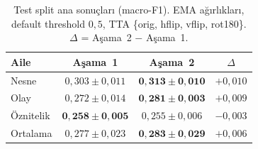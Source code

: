 \begin{table}[t]
  \caption{Test split ana sonuçları (macro-F1). EMA ağırlıkları,
    default threshold $0{,}5$, TTA \{orig, hflip, vflip, rot180\}.
    $\Delta$ = Aşama~2 $-$ Aşama~1.}
  \label{tab:main}
  \centering
  \begin{tabular}{lccc}
    \toprule
    Aile     & Aşama~1 & Aşama~2 & $\Delta$ \\
    \midrule
    Nesne    & $0{,}303 \pm 0{,}011$ & $\mathbf{0{,}313 \pm 0{,}010}$ & $+0{,}010$ \\
    Olay     & $0{,}272 \pm 0{,}014$ & $\mathbf{0{,}281 \pm 0{,}003}$ & $+0{,}009$ \\
    Öznitelik & $\mathbf{0{,}258 \pm 0{,}005}$ & $0{,}255 \pm 0{,}006$ & $-0{,}003$ \\
    \midrule
    Ortalama & $0{,}277 \pm 0{,}023$ & $\mathbf{0{,}283 \pm 0{,}029}$ & $+0{,}006$ \\
    \bottomrule
  \end{tabular}
\end{table}
